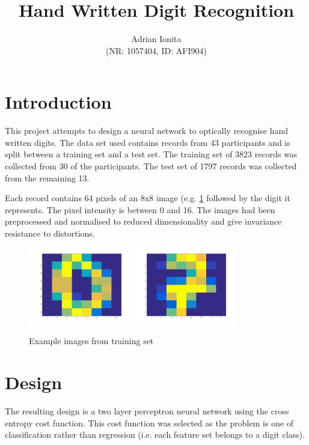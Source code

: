 \documentclass[11]{article}
\title{
  Hand Written
  Digit Recognition
  }
\date{}
\author{Adrian Ionita\\
\small{(NR: 1057404, ID: AFI904)}}
\begin{document}
\maketitle 	

\section{Introduction}
This project attempts to design a neural network to optically recognise hand written digits. The data set used contains records from 43 participants and is split between a training set and a test set. The training set of 3823 records was collected from 30 of the participants. The test set of 1797 records was collected from the remaining 13. 

Each record contains 64 pixels of an 8x8 image (e.g. \ref{fig:digits} followed by the digit it represents. The pixel intensity is between 0 and 16. The images had been preprocessed and normalised to reduced dimensionality and give invariance resistance to distortions\cite{ucidigits}. 

\begin{figure}[h]
\centering
\includegraphics[width=0.4\textwidth]{zero.png}
\includegraphics[width=0.4\textwidth]{seven.png}
\caption{Example images from training set}
\label{fig:digits}
\end{figure}
\section{Design}

The resulting design is a two layer perceptron neural network using the cross entropy cost function. This cost function was selected as the problem is one of classification rather than regression (i.e. each feature set belongs to a digit class).
\end{document}
